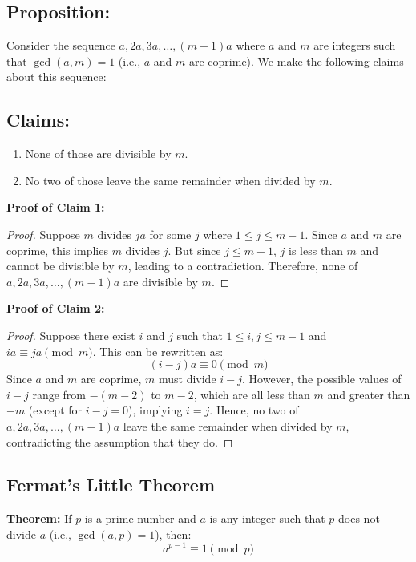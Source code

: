 \documentclass{article}
\begin{document}
\subsection*{Proposition:} 
Consider the sequence \( a, 2a, 3a, \ldots, (m-1)a \) where \( a \) and \( m \) are integers such that \( \gcd(a, m) = 1 \) (i.e., \( a \) and \( m \) are coprime). We make the following claims about this sequence:

\subsection*{Claims:}
\begin{enumerate}
    \item None of those are divisible by \( m \).
    \item No two of those leave the same remainder when divided by \( m \).
\end{enumerate}

\textbf{Proof of Claim 1:}
\begin{proof}
Suppose \( m \) divides \( ja \) for some \( j \) where \( 1 \leq j \leq m-1 \). Since \( a \) and \( m \) are coprime, this implies \( m \) divides \( j \). But since \( j \leq m-1 \), \( j \) is less than \( m \) and cannot be divisible by \( m \), leading to a contradiction. Therefore, none of \( a, 2a, 3a, \ldots, (m-1)a \) are divisible by \( m \).
\end{proof}

\textbf{Proof of Claim 2:}
\begin{proof}
Suppose there exist \( i \) and \( j \) such that \( 1 \leq i, j \leq m-1 \) and \( ia \equiv ja \pmod{m} \). This can be rewritten as:
\[ (i-j)a \equiv 0 \pmod{m} \]
Since \( a \) and \( m \) are coprime, \( m \) must divide \( i-j \). However, the possible values of \( i-j \) range from \( -(m-2) \) to \( m-2 \), which are all less than \( m \) and greater than \(-m\) (except for \( i-j = 0 \)), implying \( i = j \). Hence, no two of \( a, 2a, 3a, \ldots, (m-1)a \) leave the same remainder when divided by \( m \), contradicting the assumption that they do.
\end{proof}

\subsection*{Fermat's Little Theorem}

\textbf{Theorem:} If \( p \) is a prime number and \( a \) is any integer such that \( p \) does not divide \( a \) (i.e., \( \gcd(a, p) = 1 \)), then:
\[ a^{p-1} \equiv 1 \pmod{p} \]
\end{document}
